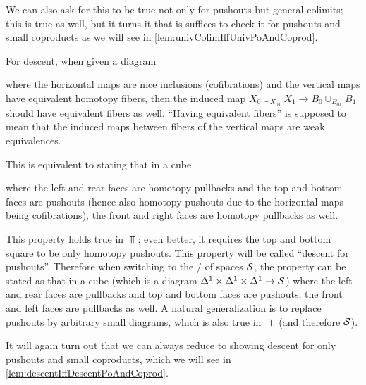 We can also ask for this to be true not only for pushouts but general colimits; this is true as well, but it turns it that is suffices to check it for pushouts and small coproducts as we will see in \cref{lem:univColimIffUnivPoAndCoprod}.

For descent, when given a diagram 
\begin{center}
\end{center}
where the horizontal maps are nice inclusions (cofibrations) and the vertical maps have equivalent homotopy fibers, then the induced map $X_0\cup_{X_{01}}X_1\to B_0\cup_{B_{01}}B_1$ should have equivalent fibers as well.
``Having equivalent fibers'' is supposed to mean that the induced maps between fibers of the vertical maps are weak equivalences.

This is equivalent to stating that in a cube 
\begin{center}
\end{center}
where the left and rear faces are homotopy pullbacks and the top and bottom faces are pushouts (hence also homotopy pushouts due to the horizontal maps being cofibrations), the front and right faces are homotopy pullbacks as well.

This property holds true in $\Top$; even better, it requires the top and bottom square to be only homotopy pushouts.
This property will be called ``descent for pushouts''.
Therefore when switching to the \inftycat/ of spaces $\mathcal{S}$, the property can be stated as that in a cube (which is a diagram $\Delta^1\times\Delta^1\times\Delta^1\to\mathcal{S}$) where the left and rear faces are pullbacks and top and bottom faces are pushouts, the front and left faces are pullbacks as well.
A natural generalization is to replace pushouts by arbitrary small diagrams, which is also true in $\Top$ (and therefore $\mathcal{S}$).

It will again turn out that we can always reduce to showing descent for only pushouts and small coproducts, which we will see in \cref{lem:descentIffDescentPoAndCoprod}.